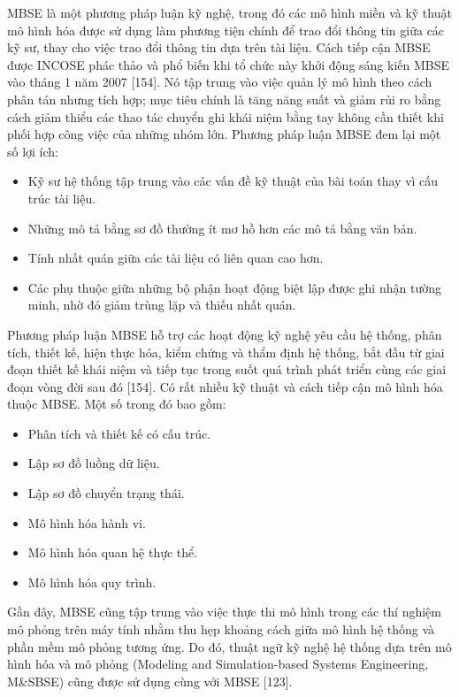 MBSE là một phương pháp luận kỹ nghệ, trong đó các mô hình miền và kỹ thuật mô hình hóa được sử dụng làm phương tiện chính để trao đổi thông tin giữa các kỹ sư, thay cho việc trao đổi thông tin dựa trên tài liệu. Cách tiếp cận MBSE được INCOSE phác thảo và phổ biến khi tổ chức này khởi động sáng kiến MBSE vào tháng 1 năm 2007 [154]. Nó tập trung vào việc quản lý mô hình theo cách phân tán nhưng tích hợp; mục tiêu chính là tăng năng suất và giảm rủi ro bằng cách giảm thiểu các thao tác chuyển ghi khái niệm bằng tay không cần thiết khi phối hợp công việc của những nhóm lớn. Phương pháp luận MBSE đem lại một số lợi ích:
\begin{itemize}
\item Kỹ sư hệ thống tập trung vào các vấn đề kỹ thuật của bài toán thay vì cấu trúc tài liệu.
\item Những mô tả bằng sơ đồ thường ít mơ hồ hơn các mô tả bằng văn bản.
\item Tính nhất quán giữa các tài liệu có liên quan cao hơn.
\item Các phụ thuộc giữa những bộ phận hoạt động biệt lập được ghi nhận tường minh, nhờ đó giảm trùng lặp và thiếu nhất quán.
\end{itemize}

Phương pháp luận MBSE hỗ trợ các hoạt động kỹ nghệ yêu cầu hệ thống, phân tích, thiết kế, hiện thực hóa, kiểm chứng và thẩm định hệ thống, bắt đầu từ giai đoạn thiết kế khái niệm và tiếp tục trong suốt quá trình phát triển cùng các giai đoạn vòng đời sau đó [154]. Có rất nhiều kỹ thuật và cách tiếp cận mô hình hóa thuộc MBSE. Một số trong đó bao gồm:
\begin{itemize}
\item Phân tích và thiết kế có cấu trúc.
\item Lập sơ đồ luồng dữ liệu.
\item Lập sơ đồ chuyển trạng thái.
\item Mô hình hóa hành vi.
\item Mô hình hóa quan hệ thực thể.
\item Mô hình hóa quy trình.
\end{itemize}

Gần đây, MBSE cũng tập trung vào việc thực thi mô hình trong các thí nghiệm mô phỏng trên máy tính nhằm thu hẹp khoảng cách giữa mô hình hệ thống và phần mềm mô phỏng tương ứng. Do đó, thuật ngữ kỹ nghệ hệ thống dựa trên mô hình hóa và mô phỏng (Modeling and Simulation-based Systems Engineering, M\&SBSE) cũng được sử dụng cùng với MBSE [123].

